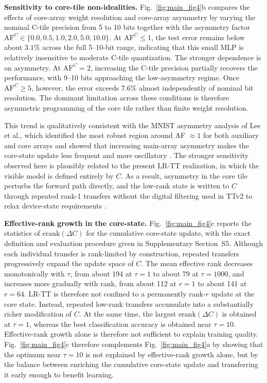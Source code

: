 \documentclass[fleqn,10pt]{wlscirep}
\begin{document}
\noindent\textbf{Sensitivity to core-tile non-idealities.}
Fig.~\ref{fig:main_fig4}b compares the effects of core-array weight resolution and core-array asymmetry by varying the nominal C-tile precision from 5 to 10 bits together with the asymmetry factor \(\mathrm{AF}^{C}\in\{0.0,0.5,1.0,2.0,5.0,10.0\}\). At \(\mathrm{AF}^{C}\leq 1\), the test error remains below about \(3.1\%\) across the full 5--10-bit range, indicating that this small MLP is relatively insensitive to moderate C-tile quantization. The stronger dependence is on asymmetry. At \(\mathrm{AF}^{C}=2\), increasing the C-tile precision partially recovers the performance, with 9--10 bits approaching the low-asymmetry regime. Once \(\mathrm{AF}^{C}\geq 5\), however, the error exceeds \(7.6\%\) almost independently of nominal bit resolution. The dominant limitation across these conditions is therefore asymmetric programming of the core tile rather than finite weight resolution.

\noindent
This trend is qualitatively consistent with the MNIST asymmetry analysis of Lee et al., which identified the most robust region around AF $\approx 1$ for both auxiliary and core arrays and showed that increasing main-array asymmetry makes the core-state update less frequent and more oscillatory \cite{lee2022tikitaka_asymmetry}. The stronger sensitivity observed here is plausibly related to the present LR-TT realization, in which the visible model is defined entirely by $C$. As a result, asymmetry in the core tile perturbs the forward path directly, and the low-rank state is written to $C$ through repeated rank-1 transfers without the digital filtering used in TTv2 to relax device-state requirements \cite{rasch2024fastrobust}. 

\noindent\textbf{Effective-rank growth in the core-state.}
Fig.~\ref{fig:main_fig4}c reports the statistics of \(\mathrm{erank}(\Delta C)\) for the cumulative core-state update, with the exact definition and evaluation procedure given in Supplementary Section~S5. Although each individual transfer is rank-limited by construction, repeated transfers progressively expand the update space of \(C\). The mean effective rank decreases monotonically with \(\tau\), from about 194 at \(\tau=1\) to about 79 at \(\tau=1000\), and increases more gradually with rank, from about 112 at \(r=1\) to about 141 at \(r=64\). LR-TT is therefore not confined to a permanently rank-\(r\) update at the core state. Instead, repeated low-rank transfers accumulate into a substantially richer modification of \(C\). At the same time, the largest \(\mathrm{erank}(\Delta C)\) is obtained at \(\tau=1\), whereas the best classification accuracy is obtained near \(\tau=10\). Effective-rank growth alone is therefore not sufficient to explain training quality. Fig.~\ref{fig:main_fig4}c therefore complements Fig.~\ref{fig:main_fig4}a by showing that the optimum near $\tau=10$ is not explained by effective-rank growth alone, but by the balance between enriching the cumulative core-state update and transferring it early enough to benefit learning. 
\end{document}

